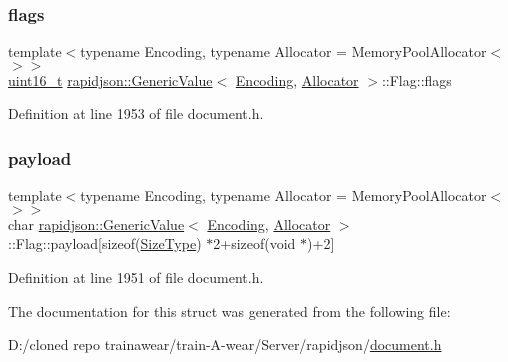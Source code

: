 \subsubsection{\texorpdfstring{flags}{flags}}
{\footnotesize\ttfamily template$<$typename Encoding, typename Allocator = Memory\+Pool\+Allocator$<$$>$$>$ \\
\mbox{\hyperlink{stdint_8h_a273cf69d639a59973b6019625df33e30}{uint16\+\_\+t}} \mbox{\hyperlink{classrapidjson_1_1_generic_value}{rapidjson\+::\+Generic\+Value}}$<$ \mbox{\hyperlink{classrapidjson_1_1_encoding}{Encoding}}, \mbox{\hyperlink{classrapidjson_1_1_allocator}{Allocator}} $>$\+::Flag\+::flags}



Definition at line 1953 of file document.\+h.

\mbox{\label{structrapidjson_1_1_generic_value_1_1_flag_a0e32e67950969b58e740e58a8bf75154}} 
\subsubsection{\texorpdfstring{payload}{payload}}
{\footnotesize\ttfamily template$<$typename Encoding, typename Allocator = Memory\+Pool\+Allocator$<$$>$$>$ \\
char \mbox{\hyperlink{classrapidjson_1_1_generic_value}{rapidjson\+::\+Generic\+Value}}$<$ \mbox{\hyperlink{classrapidjson_1_1_encoding}{Encoding}}, \mbox{\hyperlink{classrapidjson_1_1_allocator}{Allocator}} $>$\+::Flag\+::payload\mbox{[}sizeof(\mbox{\hyperlink{namespacerapidjson_a44eb33eaa523e36d466b1ced64b85c84}{Size\+Type}}) $\ast$2+sizeof(void $\ast$)+2\mbox{]}}



Definition at line 1951 of file document.\+h.



The documentation for this struct was generated from the following file\+:\begin{DoxyCompactItemize}
\item 
D\+:/cloned repo trainawear/train-\/\+A-\/wear/\+Server/rapidjson/\mbox{\hyperlink{document_8h}{document.\+h}}\end{DoxyCompactItemize}
